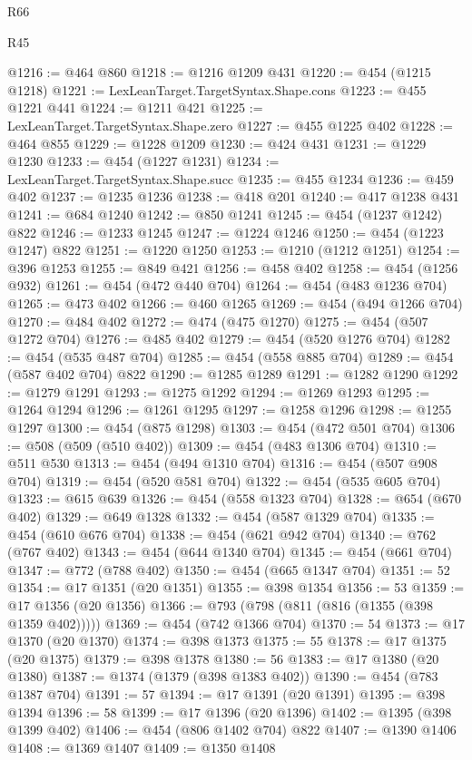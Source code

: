 \begin{lexlean}{R66}
\begin{lexlean}{R45}
\begin{coremodule}
{{{{{{{{{{{{{{{{{{{{{{{{{{{{{{{{{{{{{{{{{{{{{{{{{{{{{{{{{{{{{{{{{{{{{{{{{{{{{{{{{{{{{{{{{{{@1216 := @464 @860
@1218 := @1216 @1209 @431
@1220 := @454 (@1215 @1218)
@1221 := LexLeanTarget.TargetSyntax.Shape.cons
@1223 := @455 @1221 @441
@1224 := @1211 @421
@1225 := LexLeanTarget.TargetSyntax.Shape.zero
@1227 := @455 @1225 @402
@1228 := @464 @855
@1229 := @1228 @1209
@1230 := @424 @431
@1231 := @1229 @1230
@1233 := @454 (@1227 @1231)
@1234 := LexLeanTarget.TargetSyntax.Shape.succ
@1235 := @455 @1234
@1236 := @459 @402
@1237 := @1235 @1236
@1238 := @418 @201
@1240 := @417 @1238 @431
@1241 := @684 @1240
@1242 := @850 @1241
@1245 := @454 (@1237 @1242) @822
@1246 := @1233 @1245
@1247 := @1224 @1246
@1250 := @454 (@1223 @1247) @822
@1251 := @1220 @1250
@1253 := @1210 (@1212 @1251)
@1254 := @396 @1253
@1255 := @849 @421
@1256 := @458 @402
@1258 := @454 (@1256 @932)
@1261 := @454 (@472 @440 @704)
@1264 := @454 (@483 @1236 @704)
@1265 := @473 @402
@1266 := @460 @1265
@1269 := @454 (@494 @1266 @704)
@1270 := @484 @402
@1272 := @474 (@475 @1270)
@1275 := @454 (@507 @1272 @704)
@1276 := @485 @402
@1279 := @454 (@520 @1276 @704)
@1282 := @454 (@535 @487 @704)
@1285 := @454 (@558 @885 @704)
@1289 := @454 (@587 @402 @704) @822
@1290 := @1285 @1289
@1291 := @1282 @1290
@1292 := @1279 @1291
@1293 := @1275 @1292
@1294 := @1269 @1293
@1295 := @1264 @1294
@1296 := @1261 @1295
@1297 := @1258 @1296
@1298 := @1255 @1297
@1300 := @454 (@875 @1298)
@1303 := @454 (@472 @501 @704)
@1306 := @508 (@509 (@510 @402))
@1309 := @454 (@483 @1306 @704)
@1310 := @511 @530
@1313 := @454 (@494 @1310 @704)
@1316 := @454 (@507 @908 @704)
@1319 := @454 (@520 @581 @704)
@1322 := @454 (@535 @605 @704)
@1323 := @615 @639
@1326 := @454 (@558 @1323 @704)
@1328 := @654 (@670 @402)
@1329 := @649 @1328
@1332 := @454 (@587 @1329 @704)
@1335 := @454 (@610 @676 @704)
@1338 := @454 (@621 @942 @704)
@1340 := @762 (@767 @402)
@1343 := @454 (@644 @1340 @704)
@1345 := @454 (@661 @704)
@1347 := @772 (@788 @402)
@1350 := @454 (@665 @1347 @704)
@1351 := 52
@1354 := @17 @1351 (@20 @1351)
@1355 := @398 @1354
@1356 := 53
@1359 := @17 @1356 (@20 @1356)
@1366 := @793 (@798 (@811 (@816 (@1355 (@398 @1359 @402)))))
@1369 := @454 (@742 @1366 @704)
@1370 := 54
@1373 := @17 @1370 (@20 @1370)
@1374 := @398 @1373
@1375 := 55
@1378 := @17 @1375 (@20 @1375)
@1379 := @398 @1378
@1380 := 56
@1383 := @17 @1380 (@20 @1380)
@1387 := @1374 (@1379 (@398 @1383 @402))
@1390 := @454 (@783 @1387 @704)
@1391 := 57
@1394 := @17 @1391 (@20 @1391)
@1395 := @398 @1394
@1396 := 58
@1399 := @17 @1396 (@20 @1396)
@1402 := @1395 (@398 @1399 @402)
@1406 := @454 (@806 @1402 @704) @822
@1407 := @1390 @1406
@1408 := @1369 @1407
@1409 := @1350 @1408
}}}}}}}}}}}}}}}}}}}}}}}}}}}}}}}}}}}}}}}}}}}}}}}}}}}}}}}}}}}}}}}}}}}}}}}}}}}}}}}}}}}}}}}}}}}
\end{coremodule}
\end{lexlean}
\end{lexlean}
